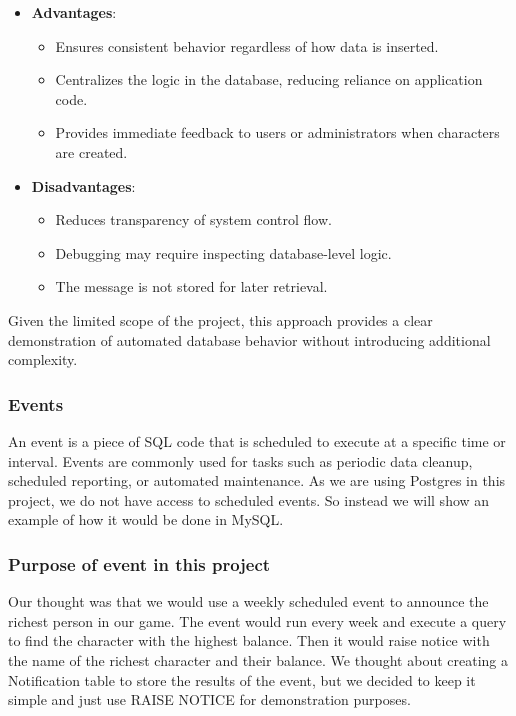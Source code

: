 \begin{itemize}
\tightlist
\item
  \textbf{Advantages}:

  \begin{itemize}
  \tightlist
  \item
    Ensures consistent behavior regardless of how data is inserted.
  \item
    Centralizes the logic in the database, reducing reliance on
    application code.
  \item
    Provides immediate feedback to users or administrators when
    characters are created.
  \end{itemize}
\item
  \textbf{Disadvantages}:

  \begin{itemize}
  \tightlist
  \item
    Reduces transparency of system control flow.
  \item
    Debugging may require inspecting database-level logic.
  \item
    The message is not stored for later retrieval.
  \end{itemize}
\end{itemize}

Given the limited scope of the project, this approach provides a clear
demonstration of automated database behavior without introducing
additional complexity.

\hypertarget{events}{%
\subsubsection{Events}\label{events}}

An event is a piece of SQL code that is scheduled to execute at a
specific time or interval. Events are commonly used for tasks such as
periodic data cleanup, scheduled reporting, or automated maintenance. As
we are using Postgres in this project, we do not have access to
scheduled events. So instead we will show an example of how it would be
done in MySQL.

\hypertarget{purpose-of-event-in-this-project}{%
\subsubsection{Purpose of event in this
project}\label{purpose-of-event-in-this-project}}

Our thought was that we would use a weekly scheduled event to announce
the richest person in our game. The event would run every week and
execute a query to find the character with the highest balance. Then it
would raise notice with the name of the richest character and their
balance. We thought about creating a Notification table to store the
results of the event, but we decided to keep it simple and just use
RAISE NOTICE for demonstration purposes.


